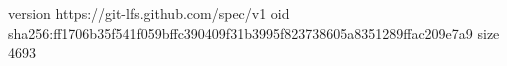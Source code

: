version https://git-lfs.github.com/spec/v1
oid sha256:ff1706b35f541f059bffc390409f31b3995f823738605a8351289ffac209e7a9
size 4693
